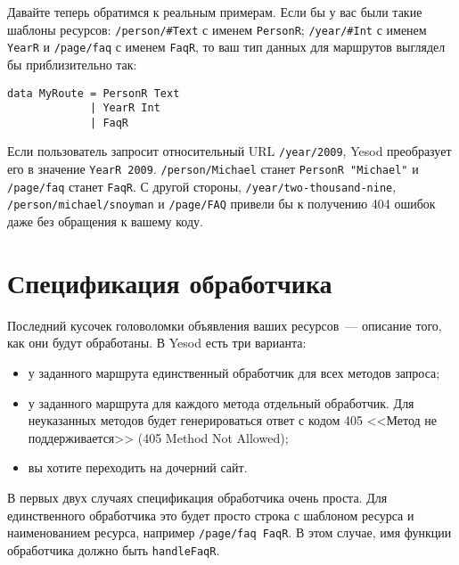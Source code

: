
Давайте теперь обратимся к реальным примерам. Если бы у вас были такие
шаблоны ресурсов: \lstinline!/person/#Text! с именем
\lstinline!PersonR!; \lstinline!/year/#Int! с именем
\lstinline!YearR! и \lstinline!/page/faq! с именем \lstinline!FaqR!,
то ваш тип данных для маршрутов выглядел бы приблизительно так:
\begin{lstlisting}
data MyRoute = PersonR Text
             | YearR Int
             | FaqR
\end{lstlisting}

Если пользователь запросит относительный URL \lstinline!/year/2009!,
Yesod преобразует его в значение \lstinline!YearR 2009!.
\lstinline!/person/Michael! станет \lstinline!PersonR "Michael"!
и \lstinline!/page/faq! станет \lstinline!FaqR!. С другой
стороны, \lstinline!/year/two-thousand-nine!,
\lstinline!/person/michael/snoyman! и \lstinline!/page/FAQ! привели бы
к получению 404 ошибок даже без обращения к вашему коду.

\section{Спецификация обработчика}
Последний кусочек головоломки объявления ваших ресурсов~--- описание
того, как они будут обработаны. В Yesod есть три варианта:
\begin{itemize}
\item у заданного маршрута единственный обработчик для всех методов запроса;
\item у заданного маршрута для каждого метода отдельный
  обработчик. Для неуказанных методов будет генерироваться ответ с
  кодом 405 <<Метод не поддерживается>> (405 Method Not
  Allowed);
\item вы хотите переходить на дочерний сайт.
\end{itemize}

В первых двух случаях спецификация обработчика очень проста. Для
единственного обработчика это будет просто строка с шаблоном ресурса и
наименованием ресурса, например \lstinline!/page/faq FaqR!. В этом
случае, имя функции обработчика должно быть \lstinline!handleFaqR!.

